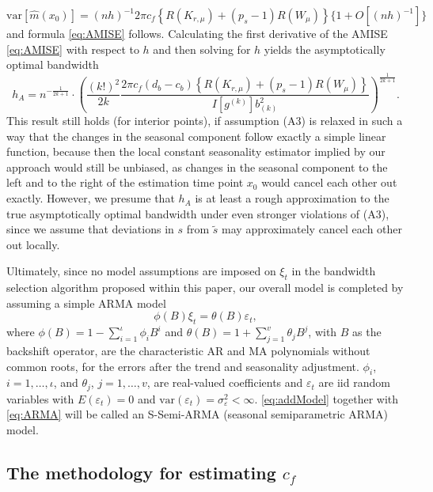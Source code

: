 \begin{equation}
\text{var}[\hat m (x_0)]=(nh)^{-1}2\pi c_f \left\{R(K_{r,\mu})+(p_s - 1)R(W_\mu)\right\}\{1+O[(nh)^{-1}]\}
\end{equation}
and formula \eqref{eq:AMISE} follows. Calculating the first derivative of the AMISE \eqref{eq:AMISE} with respect to \(h\) and then solving for \(h\) yields the asymptotically optimal bandwidth
\begin{equation}
h_A = n^{-\frac{1}{2k+1}} \cdot \left( \frac{(k!)^2}{2k} \frac{2\pi c_f (d_b - c_b) \left\{ R\left(K_{r,\mu}\right) + (p_s - 1)R(W_{\mu}) \right\}}{I\left[ g^{(k)} \right] b_{(k)}^2} \right)^{\frac{1}{2k+1}}.
\label{eq:hA}
\end{equation}
This result still holds (for interior points), if assumption (A3) is relaxed in such a way that the changes in the seasonal component follow exactly a simple linear function, because then the local constant seasonality estimator implied by our approach would still be unbiased, as changes in the seasonal component to the left and to the right of the estimation time point \(x_0\) would cancel each other out exactly. However, we presume that \(h_A\) is at least a rough approximation to the true asymptotically optimal bandwidth under even stronger violations of (A3), since we assume that deviations in \(s\) from \(\tilde s\) may approximately cancel each other out locally.

Ultimately, since no model assumptions are imposed on \(\xi_t\) in the bandwidth selection algorithm proposed within this paper, our overall model is completed by assuming a simple ARMA model
\begin{equation}
\phi(B)\xi_t = \theta(B)\varepsilon_t,
\label{eq:ARMA}
\end{equation}
where \(\phi(B) = 1-\sum_{i=1}^{\iota}\phi_iB^i\) and \(\theta(B) = 1+\sum_{j=1}^{v}\theta_jB^j\), with \(B\) as the backshift operator, are the characteristic AR and MA polynomials without common roots, for the errors after the trend and seasonality adjustment. \(\phi_i\), \(i=1,\dots,\iota\), and \(\theta_j\), \(j=1,\dots,v\), are real-valued coefficients and \(\varepsilon_t\) are iid random variables with \(E(\varepsilon_t)=0\) and \(\text{var}(\varepsilon_t)=\sigma^2_\varepsilon < \infty\). \eqref{eq:addModel} together with \eqref{eq:ARMA} will be called an S-Semi-ARMA (seasonal semiparametric ARMA) model.

\subsection{\texorpdfstring{The methodology for estimating \(c_f\)}{The methodology for estimating c\_f}}\label{sec:cf}

